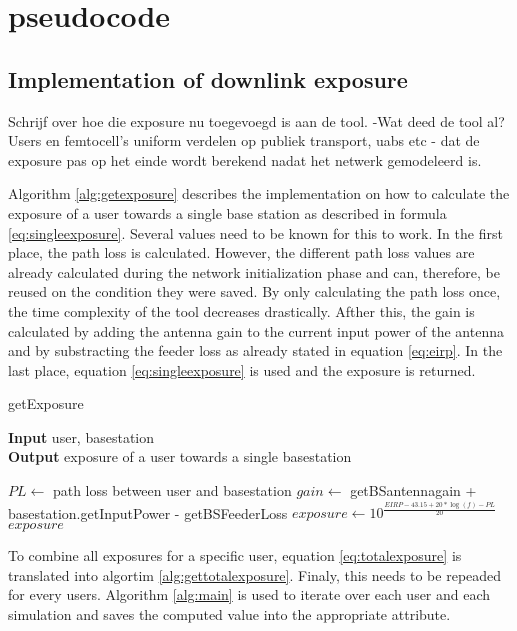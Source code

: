 \chapter{pseudocode}
\label{chap:pseudocode}

\section{Implementation of downlink exposure}
\label{sec:downlinkimplementation}

Schrijf over hoe die exposure nu toegevoegd is aan de tool. 
-Wat deed de tool al? Users en femtocell's uniform verdelen op publiek transport, uabs etc
- dat de exposure pas op het einde wordt berekend nadat het netwerk gemodeleerd is.

Algorithm \ref{alg:getexposure} describes the implementation on how to calculate the exposure of a user towards a single base station as described in formula \ref{eq:singleexposure}.
Several values need to be known for this to work. In the first place, the path loss is calculated.  However, the different path loss values are already calculated during the network initialization phase and can, therefore, be reused on the condition they were saved. By only calculating the path loss once,  the time complexity of the tool decreases drastically. 
Afther this, the gain is calculated by adding the antenna gain to the  current input power of the antenna and by substracting the feeder loss as already stated in equation \ref{eq:eirp}.
In the last place, equation \ref{eq:singleexposure} is used and the exposure is returned.

\begin{algorithm}
	\caption{getExposure} 
	\label{alg:getexposure}
     \hspace*{\algorithmicindent} \textbf{Input} user, basestation\\
     \hspace*{\algorithmicindent} \textbf{Output} exposure of a user towards a single basestation
	\begin{algorithmic}[1]
        \State $PL \gets$ path loss between user and basestation
        \State $gain \gets$ getBSantennagain + basestation.getInputPower - getBSFeederLoss
		\State $exposure \gets 10^{\frac{EIRP - 43.15 + 20*\log(f)- PL}{20}}$ \\
    \Return $exposure$ 
	\end{algorithmic} 
\end{algorithm}

To combine all exposures for a specific user, equation \ref{eq:totalexposure} is translated into algortim \ref{alg:gettotalexposure}.
Finaly, this needs to be repeaded for every users. Algorithm \ref{alg:main} is used to iterate over each user and each simulation and saves the computed value
into the appropriate attribute.

